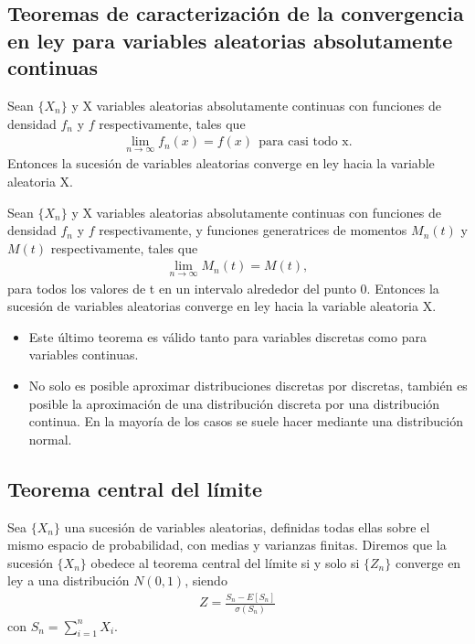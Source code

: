 \subsection{Teoremas de caracterización de la convergencia en ley para variables aleatorias absolutamente continuas}

\begin{teo}
    Sean $\{X_n\}$ y X variables aleatorias absolutamente continuas con funciones de densidad $f_n$ y $f$ respectivamente, tales que
    \begin{align*}
        \lim_{n \to \infty}{f_n(x) = f(x)} \ \ \text{para casi todo x}.
    \end{align*}
    Entonces la sucesión de variables aleatorias converge en ley hacia la variable aleatoria X.
\end{teo}

\begin{teo}
    Sean $\{X_n\}$ y X variables aleatorias absolutamente continuas con funciones de densidad $f_n$ y $f$ respectivamente, y funciones generatrices de momentos $M_n(t)$ y $M(t)$ respectivamente, tales que
    \begin{align*}
        \lim_{n \to \infty}{M_n(t) = M(t)},
    \end{align*}
    para todos los valores de t en un intervalo alrededor del punto 0. Entonces la sucesión de variables aleatorias converge en ley hacia la variable aleatoria X.
\end{teo}

\begin{obs}
    \begin{itemize}
        \item Este último teorema es válido tanto para variables discretas como para variables continuas.
        \item No solo es posible aproximar distribuciones discretas por discretas, también es posible la aproximación de una distribución discreta por una distribución continua. En la mayoría de los casos se suele hacer mediante una distribución normal.
    \end{itemize}
\end{obs}

\subsection{Teorema central del límite}

\begin{defi}
    Sea $\{X_n\}$ una sucesión de variables aleatorias, definidas todas ellas sobre el mismo espacio de probabilidad, con medias y varianzas finitas. Diremos que la sucesión $\{X_n\}$ obedece al teorema central del límite si y solo si $\{Z_n\}$ converge en ley a una distribución $N(0,1)$, siendo
    \begin{align*}
        Z = \frac{S_n - E[S_n]}{\sigma(S_n)}
    \end{align*}
    con $S_n = \sum_{i=1}^{n}{X_i}$.
\end{defi}

